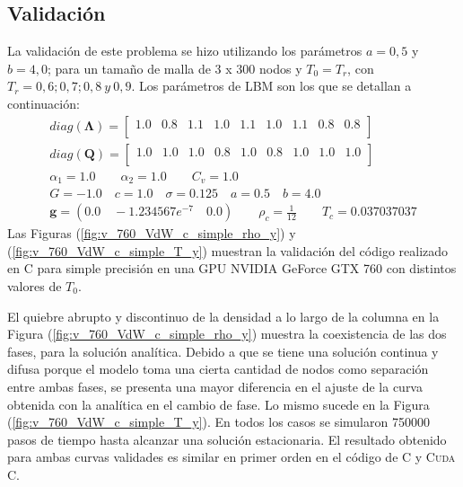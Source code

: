 \subsection{Validación}

La validación de este problema se hizo utilizando los parámetros $a =0,5$ y $b = 4,0$; para un tamaño de malla de 3 x 300 nodos y $T_0 = T_r$, con $T_r = 0,6 ; 0,7 ; 0,8 \> y \> 0,9$.  Los parámetros de LBM son los que se detallan a continuación:
\begin{align*}
diag(\mathbf{\Lambda}) = 
\begin{bmatrix}
1.0 & 0.8 & 1.1 & 1.0 & 1.1 & 1.0 & 1.1 & 0.8 & 0.8 \\
\end{bmatrix}\\
diag(\mathbf{Q}) = 
\begin{bmatrix}
1.0 & 1.0 & 1.0 & 0.8 & 1.0 & 0.8 & 1.0 & 1.0 & 1.0 \\
\end{bmatrix}\\
\alpha_{1} = 1.0 \qquad 	\alpha_{2} = 1.0 \qquad C_{v} = 1.0\\
G = -1.0 \quad c = 1.0 \quad \sigma = 0.125 \quad a = 0.5 \quad b = 4.0 \\
\mathbf{g} = (0.0 \quad-1.234567e^{-7}\quad 0.0 ) \qquad \rho_c = \frac{1}{12} \qquad T_c = 0.037037037
\end{align*}
Las Figuras (\ref{fig:v_760_VdW_c_simple_rho_y}) y (\ref{fig:v_760_VdW_c_simple_T_y})  muestran la validación del código realizado en \textsc{C} para simple precisión en una GPU NVIDIA GeForce GTX 760 con distintos valores de $T_0$. 

El quiebre abrupto y discontinuo de la densidad a lo largo de la columna en la Figura (\ref{fig:v_760_VdW_c_simple_rho_y}) muestra la coexistencia de las dos fases, para la solución analítica. Debido a que se tiene una solución continua y difusa porque el modelo toma una cierta cantidad de nodos como separación entre ambas fases, se presenta una mayor diferencia en el ajuste de la curva obtenida con la analítica en el cambio de fase. Lo mismo sucede en la Figura (\ref{fig:v_760_VdW_c_simple_T_y}). En todos los casos se simularon 750000 pasos de tiempo hasta alcanzar una solución estacionaria. El resultado obtenido para ambas curvas validades es similar en primer orden en el código de \textsc{C} y \textsc{Cuda C}.

